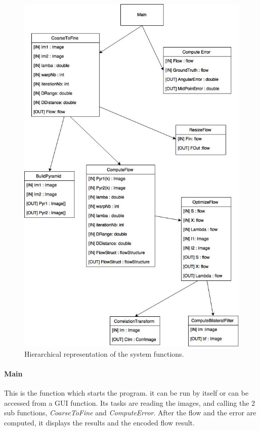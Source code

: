 \documentclass[12pt,a4paper,twoside]{report}
\begin{document}
{\begin{figure}
	\label{funcdiag}
	\centering
	\includegraphics[width = 6in]{img/functions} 
	\caption{Hierarchical representation of the system functions.}
\end{figure}

\paragraph{Main} This is the function which starts the program. it can be run by itself or can be accessed from a GUI function.
Its tasks are reading the images, and  calling the 2 sub functions, \textit{CoarseToFine} and \textit{ComputeError}. After the flow and the error are computed, it displays the results and the encoded flow result.

}
\end{document}
